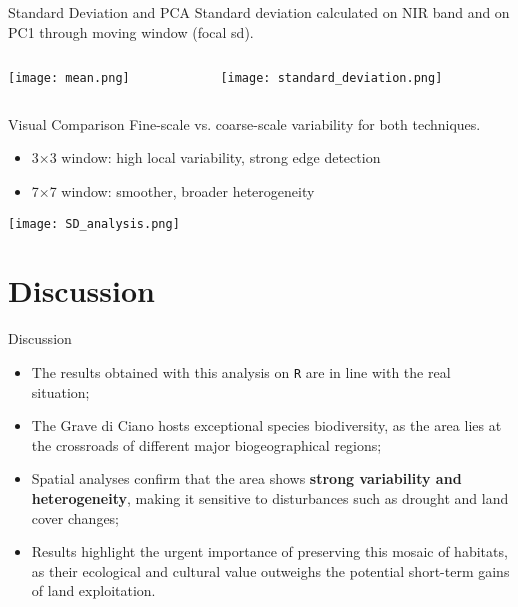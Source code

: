 \documentclass{beamer}
\begin{document}
\begin{frame}{Standard Deviation and PCA}
\centering
Standard deviation calculated on NIR band and on PC1 through moving window (focal sd).



\begin{columns}
    \begin{column}{0.48\textwidth}
        \centering
        \texttt{[image: mean.png]} 
    \end{column}
    \begin{column}{0.48\textwidth}
        \centering
        \texttt{[image: standard\_deviation.png]} 
    \end{column}
\end{columns}
\end{frame}



\begin{frame}{Visual Comparison}
    \centering
    Fine-scale vs. coarse-scale variability for both techniques.
    \begin{itemize}
        \item 3×3 window: high local variability, strong edge detection
        \item 7×7 window: smoother, broader heterogeneity
    \end{itemize}
    
    \texttt{[image: SD\_analysis.png]} 
\end{frame}

\section{Discussion}
\begin{frame}{Discussion}
    \begin{itemize}
        \item The results obtained with this analysis on \texttt{R} are in line with the real situation;
       \item The Grave di Ciano hosts exceptional species biodiversity, as the area lies at the crossroads of different major biogeographical regions;
       \item Spatial analyses confirm that the area shows \textbf{strong variability and heterogeneity}, making it sensitive to disturbances such as drought and land cover changes;
       \item Results highlight the urgent importance of preserving this mosaic of habitats, as their ecological and cultural value outweighs the potential short-term gains of land exploitation.
    \end{itemize}
    
\end{frame}
\end{document}
